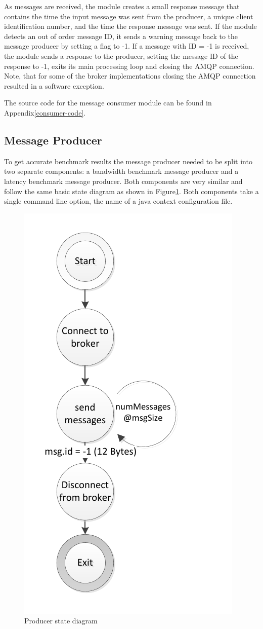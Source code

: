 \documentclass{thesis}
\begin{document}
As messages are received, the module creates a small response message that contains the time the input message was sent from the producer, a unique client identification number, and the time the response message was sent.  If the module detects an out of order message ID, it sends a warning message back to the message producer by setting a flag to -1.  If a message with ID = -1 is received, the module sends a response to the producer, setting the message ID of the response to -1, exits its main processing loop and closing the AMQP connection.  Note, that for some of the broker implementations closing the AMQP connection resulted in a software exception.

The source code for the message consumer module can be found in Appendix\ref{consumer-code}. 
\pagebreak
\subsection{Message Producer}
To get accurate benchmark results the message producer needed to be split into two separate components: a bandwidth benchmark message producer and a latency benchmark message producer.  Both components are very similar and follow the same basic state diagram as shown in Figure\ref{producer-state-diagram}.  Both components take a single command line option, the name of a java context configuration file.
\begin{figure}
\begin{center}
\vspace{-20pt}
\includegraphics[width=.3\textwidth]{producer_state_diagram}  
\end{center}
\vspace{-20pt}
\caption{Producer state diagram}
\label{producer-state-diagram}
\end{figure}
\end{document}
